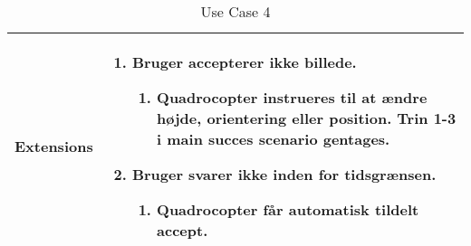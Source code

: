 \begin{table}[H]
\begin{tabular}{|l|p{10cm}|}
Extensions							& 

									\renewcommand{\labelenumi}{\Roman{enumi}:}
									\renewcommand{\labelenumii}{\alph{enumii})}
									\begin{enumerate}[topsep=0.0cm,leftmargin=0.5cm]
										\item Bruger accepterer ikke billede.
											\begin{enumerate}[topsep=0cm, leftmargin=1cm]
												\item Quadrocopter instrueres til at ændre højde, orientering eller position. Trin 1-3 i main succes scenario gentages.
											\end{enumerate}
										\item Bruger svarer ikke inden for tidsgrænsen.
											\begin{enumerate}[topsep=0cm, leftmargin=1cm]
												\item Quadrocopter får automatisk tildelt accept.
											\end{enumerate}
									\end{enumerate} \\\hline	

\end{tabular}
\caption{Use Case 4}
\label{tab:UC4}
\end{table}